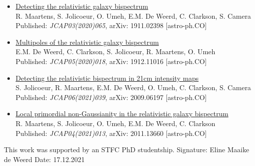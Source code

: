 {\begin{itemize}
	Published: \textit{MNRAS Letters 486 (2019) L101},	arXiv: 1812.09512 [astro-ph.CO]
	\item \underline{Detecting the relativistic galaxy bispectrum} \\
	R. Maartens, S. Jolicoeur, O. Umeh, E.M. De Weerd, C. Clarkson, S. Camera\\
	Published: \textit{JCAP03(2020)065},	arXiv: 1911.02398 [astro-ph.CO]
	\item \underline{Multipoles of the relativistic galaxy bispectrum} \\
	E.M. De Weerd, C. Clarkson, S. Jolicoeur, R. Maartens, O. Umeh \\
	Published: \textit{JCAP05(2020)018},	arXiv: 1912.11016 [astro-ph.CO]
	\item \underline{Detecting the relativistic bispectrum in 21cm intensity maps} \\
	S. Jolicoeur, R. Maartens, E.M. De Weerd, O. Umeh, C. Clarkson, S. Camera \\
	Published: \textit{JCAP06(2021)039},	arXiv: 2009.06197 [astro-ph.CO]
	\item \underline{Local primordial non-Gaussianity in the relativistic galaxy bispectrum} \\
	R. Maartens, S. Jolicoeur, O. Umeh, E.M. De Weerd, C. Clarkson \\
	Published: \textit{JCAP04(2021)013},	arXiv: 2011.13660 [astro-ph.CO]
\end{itemize}
This work was supported by an STFC PhD studentship.
\vfill
\noindent Signature: Eline Maaike de Weerd
\newline
Date: 17.12.2021}
\thispagestyle{empty}


\maketitle

